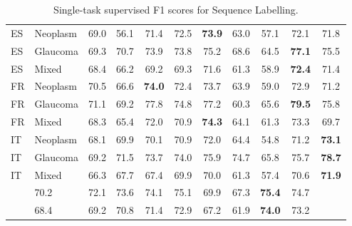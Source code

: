 \begin{table}[htb]
{\begin{tabular}{@{}llccccccc|cc@{}}
\rowcolor{CornflowerBlue!15}ES            & Neoplasm               & 69.0      & 56.1   & 71.4          & 72.5          & \textbf{73.9} & 63.0            & 57.1 & 72.1          & 71.8          \\
\rowcolor{CornflowerBlue!15}ES            & Glaucoma               & 69.3      & 70.7   & 73.9          & 73.8          & 75.2          & 68.6            & 64.5 & \textbf{77.1} & 75.5          \\
\rowcolor{CornflowerBlue!15}ES            & Mixed                  & 68.4      & 66.2   & 69.2          & 69.3          & 71.6          & 61.3            & 58.9 & \textbf{72.4} & 71.4          \\
\rowcolor{CornflowerBlue!15}FR            & Neoplasm               & 70.5      & 66.6   & \textbf{74.0} & 72.4          & 73.7          & 63.9            & 59.0 & 72.9          & 71.2          \\
\rowcolor{CornflowerBlue!15}FR            & Glaucoma               & 71.1      & 69.2   & 77.8          & 74.8          & 77.2          & 60.3            & 65.6 & \textbf{79.5} & 75.8          \\
\rowcolor{CornflowerBlue!15}FR            & Mixed                  & 68.3      & 65.4   & 72.0          & 70.9          & \textbf{74.3} & 64.1            & 61.3 & 73.3          & 69.7          \\
\rowcolor{CornflowerBlue!15}IT            & Neoplasm               & 68.1      & 69.9   & 70.1          & 70.9          & 72.0          & 64.4            & 54.8 & 71.2          & \textbf{73.1} \\
\rowcolor{CornflowerBlue!15}IT            & Glaucoma               & 69.2      & 71.5   & 73.7          & 74.0          & 75.9          & 74.7            & 65.8 & 75.7          & \textbf{78.7} \\
\rowcolor{CornflowerBlue!15}IT            & Mixed                  & 66.3      & 67.7   & 67.4          & 69.9          & 70.0          & 61.3            & 57.4 & 70.6          & \textbf{71.9} \\ \midrule
\rowcolor{ForestGreen!10}\multicolumn{2}{c}{AVERAGE}            & 70.2      & 72.1   & 73.6          & 74.1          & 75.1          & 69.9            & 67.3                     & \textbf{75.4} & 74.7          \\
\rowcolor{ForestGreen!10}\multicolumn{2}{l}{AVERAGE ES, FR, IT} & 68.4      & 69.2   & 70.8          & 71.4          & 72.9          & 67.2            & 61.9                     & \textbf{74.0} & 73.2   \\ \bottomrule

\end{tabular}
}
\caption{Single-task supervised F1 scores for Sequence Labelling.}
\label{tab7:SingleTask}
\end{table}